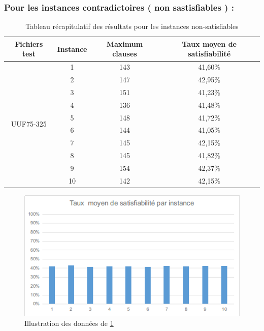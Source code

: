 \subsubsection{Pour les instances contradictoires ( non sastisfiables ) : }
\begin{table}[H]
	\centering
	\label{table:Tab_BFS_Non_Sat}
	\begin{tabular}{|c|c|c|c|}
		\hline
		Fichiers test               & Instance & Maximum clauses & Taux moyen de satisfiabilité \\ \hline
		\multirow{10}{*}{UUF75-325} & 1        & 143             & 41,60\%                      \\ \cline{2-4} 
		& 2        & 147             & 42,95\%                      \\ \cline{2-4} 
		& 3        & 151             & 41,23\%                      \\ \cline{2-4} 
		& 4        & 136             & 41,48\%                      \\ \cline{2-4} 
		& 5        & 148             & 41,72\%                      \\ \cline{2-4} 
		& 6        & 144             & 41,05\%                      \\ \cline{2-4} 
		& 7        & 145             & 42,15\%                      \\ \cline{2-4} 
		& 8        & 145             & 41,82\%                      \\ \cline{2-4} 
		& 9        & 154             & 42,37\%                      \\ \cline{2-4} 
		& 10       & 142             & 42,15\%                      \\ \hline
	\end{tabular}
	\caption{Tableau récapitulatif des résultats pour les instances non-satisfiables}
\end{table}
\newpage
\begin{figure}[H]
	\includegraphics[width=\textwidth]{images/BFSUUF75Graph.png}
	\caption{Illustration des données de \ref{table:Tab_BFS_Non_Sat}}
\end{figure}

